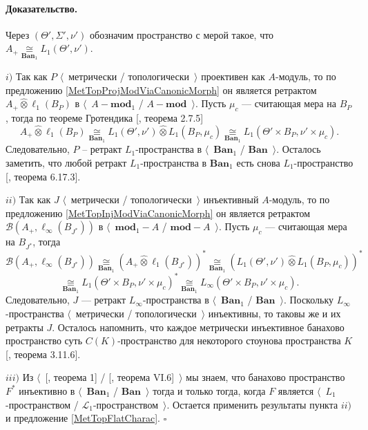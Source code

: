 \documentclass[12pt]{article}
\newcommand{\projtens}{\mathbin{\widehat{\otimes}}}
\newcommand{\isom}[1]{\mathop{\mathbin{\cong}}\limits_{#1}}
\renewenvironment{proof}{\paragraph{Доказательство.}}{\hfill$\square$\medskip}
\begin{document}
\begin{proof} Через $(\Theta',\Sigma', \nu')$ обозначим пространство с мерой такое, что $A_+\isom{\mathbf{Ban}_1} L_1(\Theta',\nu')$.

$i)$ Так как $P$ $\langle$~метрически / топологически~$\rangle$ проективен как $A$-модуль, то по предложению \ref{MetTopProjModViaCanonicMorph} он является ретрактом $A_+\projtens \ell_1(B_P)$ в $\langle$~$A-\mathbf{mod}_1$ / $A-\mathbf{mod}$~$\rangle$. Пусть $\mu_c$ --- считающая мера на $B_P$, тогда по теореме Гротендика [\cite{HelLectAndExOnFuncAn}, теорема 2.7.5]
$$
A_+\projtens\ell_1(B_P)
\isom{\mathbf{Ban}_1}L_1(\Theta',\nu')\projtens L_1(B_P,\mu_c)
\isom{\mathbf{Ban}_1}L_1(\Theta'\times B_P,\nu'\times \mu_c).
$$
Следовательно, $P$ -- ретракт $L_1$-пространства в $\langle$~$\mathbf{Ban}_1$ / $\mathbf{Ban}$~$\rangle$. Осталось заметить, что любой ретракт $L_1$-пространства в $\mathbf{Ban}_1$ есть снова $L_1$-пространство [\cite{LaceyIsomThOfClassicBanSp}, теорема 6.17.3].

$ii)$ Так как $J$ $\langle$~метрически / топологически~$\rangle$ инъективный $A$-модуль, то по предложению \ref{MetTopInjModViaCanonicMorph} он является ретрактом $\mathcal{B}(A_+,\ell_\infty(B_{J^*}))$ в $\langle$~$\mathbf{mod}_1-A$ / $\mathbf{mod}-A$~$\rangle$. Пусть $\mu_c$ --- считающая мера на $B_{J^*}$, тогда
$$
\mathcal{B}(A_+,\ell_\infty(B_{J^*}))
\isom{\mathbf{Ban}_1}(A_+\projtens \ell_1(B_{J^*}))^*
\isom{\mathbf{Ban}_1}(L_1(\Theta',\nu')\projtens L_1(B_P,\mu_c))^*
$$
$$
\isom{\mathbf{Ban}_1}L_1(\Theta'\times B_P,\nu'\times \mu_c)^*
\isom{\mathbf{Ban}_1}L_\infty(\Theta'\times B_P,\nu'\times \mu_c).
$$
Следовательно, $J$ --- ретракт $L_\infty$-пространства в $\langle$~$\mathbf{Ban}_1$ / $\mathbf{Ban}$~$\rangle$. Поскольку $L_\infty$-пространства $\langle$~метрически / топологически~$\rangle$ инъективны, то таковы же и их ретракты $J$. Осталось напомнить, что каждое метрически инъективное банахово пространство суть $C(K)$-пространство для некоторого стоунова пространства $K$ [\cite{LaceyIsomThOfClassicBanSp}, теорема 3.11.6].

$iii)$ Из $\langle$~[\cite{GrothMetrProjFlatBanSp}, теорема 1] / [\cite{StegRethNucOpL1LInfSp}, теорема VI.6]~$\rangle$ мы знаем, что банахово пространство $F^*$ инъективно в $\langle$~$\mathbf{Ban}_1$ / $\mathbf{Ban}$~$\rangle$ тогда и только тогда, когда $F$ является $\langle$~$L_1$-пространством / $\mathscr{L}_1$-пространством~$\rangle$. Остается применить результаты пункта $ii)$ и предложение \ref{MetTopFlatCharac}.
\end{proof}
\end{document}

